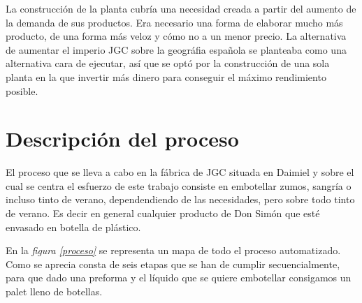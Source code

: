 \documentclass[11pt,a4paper,spanish,twoside]{report}
\begin{document}
La construcción de la planta cubría una necesidad creada a partir del aumento
de la demanda de sus productos. Era necesario una forma de elaborar mucho más
producto, de una forma más veloz y cómo no a un menor precio. La alternativa
de aumentar el imperio JGC sobre la geográfia española se planteaba como una
alternativa cara de ejecutar, así que se optó por la construcción de una sola
planta en la que invertir más dinero para conseguir el máximo rendimiento posible. 

\chapter{Descripción del proceso}
El proceso que se lleva a cabo en la fábrica de JGC situada en Daimiel y
sobre el cual se centra el esfuerzo de este trabajo consiste en embotellar
zumos, sangría o incluso tinto de verano, dependendiendo de las necesidades,
pero sobre todo tinto de verano. Es decir en general cualquier producto de
Don Simón que esté envasado en botella de plástico.

En la \emph{figura \ref{proceso}} se representa un mapa de todo el proceso
automatizado. Como se aprecia consta de seis etapas que se han de cumplir
secuencialmente, para que dado una preforma y el líquido que se quiere
embotellar consigamos un palet lleno de botellas.
\end{document}
